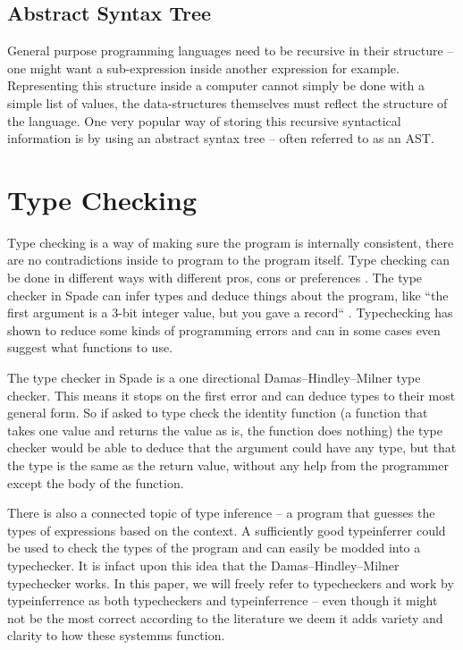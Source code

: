 \subsection{Abstract Syntax Tree}
General purpose programming languages need to be recursive in their structure -- one might want a sub-expression inside another expression for example. Representing this structure inside a computer cannot simply be done with a simple list of values, the data-structures themselves must reflect the structure of the language. One very popular way of storing this recursive syntactical information is by using an abstract syntax tree -- often referred to as an AST.


\section{Type Checking} %
\label{sec:TypeChecking}
Type checking is a way of making sure the program is internally consistent, there are no contradictions inside to program to the program itself. Type checking can be done in different ways with different pros, cons or preferences \cite{src:TypeCheckersBook}. The type checker in Spade can infer types and deduce things about the program, like ``the first argument is a 3-bit integer value, but you gave a record`` \cite{src:spadeAnHDL}. Typechecking has shown to reduce some kinds of programming errors and can in some cases even suggest what functions to use.

The type checker in Spade is a one directional Damas–Hindley–Milner type checker. This means it stops on the first error and can deduce types to their most general form. So if asked to type check the identity function (a function that takes one value and returns the value as is, the function does nothing) the type checker would be able to deduce that the argument could have any type, but that the type is the same as the return value, without any help from the programmer except the body of the function. \cite{src:DamasHindleyMilner}

There is also a connected topic of type inference -- a program that guesses the types of expressions based on the context. A sufficiently good typeinferrer could be used to check the types of the program and can easily be modded into a typechecker. It is infact upon this idea that the Damas–Hindley–Milner typechecker works. In this paper, we will freely refer to typecheckers and work by typeinferrence as both typecheckers and typeinferrence -- even though it might not be the most correct according to the literature we deem it adds variety and clarity to how these systemms function.


